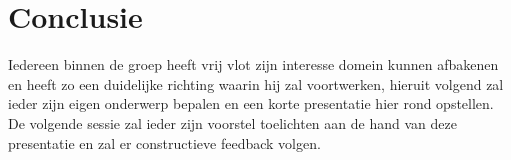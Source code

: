 \documentclass[fleqn,10pt]{voorstel}
\begin{document}
\section{Conclusie}
Iedereen binnen de groep heeft vrij vlot zijn interesse domein kunnen afbakenen en heeft zo een duidelijke richting waarin hij zal voortwerken, hieruit volgend zal ieder zijn eigen onderwerp bepalen en een korte presentatie hier rond opstellen. De volgende sessie zal ieder zijn voorstel toelichten aan de hand van deze presentatie en zal er constructieve feedback volgen.



\end{document}
